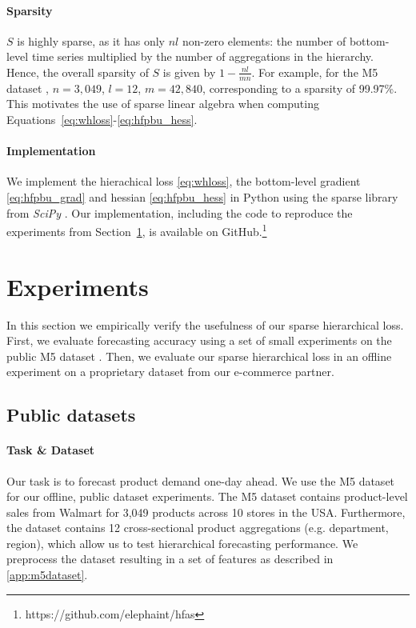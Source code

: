 \documentclass[preprint, 3p, times, twocolumn]{elsarticle}
\begin{document}
\paragraph{Sparsity} \(S\) is highly sparse, as it has only \(nl\) non-zero elements: the number of bottom-level time series multiplied by the number of aggregations in the hierarchy. Hence, the overall sparsity of \(S\) is given by \( 1 - \frac{nl}{mn} \). For example, for the M5 dataset \cite{makridakis_m5_2021}, \(n = 3,049\), \(l = 12\), \(m=42,840\), corresponding to a sparsity of 99.97\%. This motivates the use of sparse linear algebra when computing Equations~\eqref{eq:whloss}-\eqref{eq:hfpbu_hess}.

\paragraph{Implementation} We implement the hierachical loss \eqref{eq:whloss}, the bottom-level gradient \eqref{eq:hfpbu_grad} and hessian \eqref{eq:hfpbu_hess} in Python using the sparse library from \textit{SciPy} \cite{virtanen_scipy_2020}. Our implementation, including the code to reproduce the experiments from Section~\ref{sec:experiments}, is available on GitHub.\footnote{https://github.com/elephaint/hfas}

\section{Experiments}
  \label{sec:experiments}
  In this section we empirically verify the usefulness of our sparse hierarchical loss. First, we evaluate forecasting accuracy using a set of small experiments on the public M5 dataset \cite{makridakis_m5_2021}. Then, we evaluate our sparse hierarchical loss in an offline experiment on a proprietary dataset from our e-commerce partner.

  \subsection{Public datasets} \label{subsec:publicdatasets}
  \paragraph{Task \& Dataset} Our task is to forecast product demand one-day ahead. We use the M5 dataset \cite{makridakis_m5_2021} for our offline, public dataset experiments. The M5 dataset contains product-level sales from Walmart for 3,049 products across 10 stores in the USA. Furthermore, the dataset contains 12 cross-sectional product aggregations (e.g. department, region), which allow us to test hierarchical forecasting performance. We preprocess the dataset resulting in a set of features as described in \ref{app:m5dataset}.
  
\end{document}
